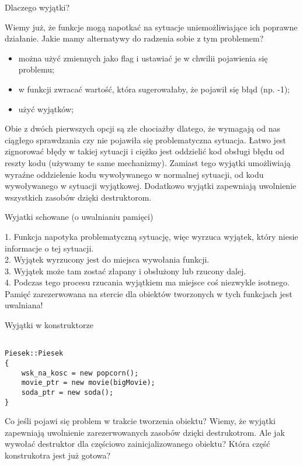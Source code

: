 \documentclass[notheorems, aspectratio=54]{beamer}
\begin{document}
\begin{frame}
	Dlaczego wyjątki?
	
	Wiemy już, że funkcje mogą napotkać na sytuacje uniemożliwiające ich poprawne działanie.
	Jakie mamy alternatywy do radzenia sobie z tym problemem?
	
	\begin{itemize}
		\item można użyć zmiennych jako flag i ustawiać je w chwilii pojawienia się problemu;
		\item w funkcji zwracać wartość, która sugerowałaby, że pojawił się błąd (np. -1);
		\item użyć wyjątków;
	\end{itemize}
	  
	Obie z dwóch pierwszych opcji są złe chociażby dlatego, że wymagają od nas ciągłego sprawdzania czy nie pojawiła się problematyczna sytuacja.
	Łatwo jest zignorować błędy w takiej sytuacji i ciężko jest oddzielić kod obsługi błędu od reszty kodu (używamy te same mechanizmy).
	Zamiast tego wyjątki umożliwiają wyraźne oddzielenie kodu wywoływanego w normalnej sytuacji, od kodu wywoływanego w sytuacji wyjątkowej.
	Dodatkowo wyjątki zapewniają uwolnienie wszystkich zasobów dzięki destruktorom.
\end{frame}


\begin{frame}
	Wyjatki schowane (o uwalnianiu pamięci)
	
	1. Funkcja napotyka problematyczną sytuację, więc wyrzuca wyjątek, który niesie informacje o tej sytuacji.\\
	2. Wyjątek wyrzucony jest do miejsca wywołania funkcji.\\
	3. Wyjątek może tam zostać złapany i obsłużony lub rzucony dalej.\\
	4. Podczas tego procesu rzucania wyjątkiem ma miejsce coś niezwykle isotnego. Pamięć zarezerwowana na stercie dla obiektów tworzonych w tych funkcjach jest uwalniana!
\end{frame}

\begin{frame}[fragile]
	Wyjątki w konstruktorze\\
	\begin{lstlisting}

Piesek::Piesek 
{
	wsk_na_kosc = new popcorn();
	movie_ptr = new movie(bigMovie);
	soda_ptr = new soda();
}
	\end{lstlisting}
	
	Co jeśli pojawi się problem w trakcie tworzenia obiektu? 
	Wiemy, że wyjątki zapewniają uwolnienie zarezerwowanych zasobów dzięki destrukotrom.
	Ale jak wywołać destruktor dla częściowo zainicjalizowanego obiektu?
	Która część konstrukotra jest już gotowa?
	
\end{frame}
\end{document}
